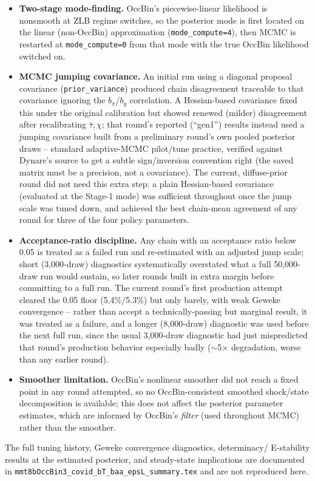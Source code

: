 \documentclass[11pt]{article}
\begin{document}
\begin{itemize}
\item \textbf{Two-stage mode-finding.} OccBin's piecewise-linear
likelihood is nonsmooth at ZLB regime switches, so the posterior mode
is first located on the linear (non-OccBin) approximation
(\texttt{mode\_compute=4}), then MCMC is restarted at
\texttt{mode\_compute=0} from that mode with the true OccBin likelihood
switched on.
\item \textbf{MCMC jumping covariance.} An initial run using a diagonal
proposal covariance (\texttt{prior\_variance}) produced chain
disagreement traceable to that covariance ignoring the $b_\pi$/$b_y$
correlation. A Hessian-based covariance fixed this under the original
calibration but showed renewed (milder) disagreement after
recalibrating $\bar\tau,\chi$; that round's reported (``gen1'') results
instead used a jumping covariance built from a preliminary round's own
pooled posterior draws -- standard adaptive-MCMC pilot/tune practice,
verified against Dynare's source to get a subtle sign/inversion
convention right (the saved matrix must be a precision, not a
covariance). The current, diffuse-prior round did not need this extra
step: a plain Hessian-based covariance (evaluated at the Stage-1 mode)
was sufficient throughout once the jump scale was tuned down, and
achieved the best chain-mean agreement of any round for three of the
four policy parameters.
\item \textbf{Acceptance-ratio discipline.} Any chain with an
acceptance ratio below 0.05 is treated as a failed run and re-estimated
with an adjusted jump scale; short (3,000-draw) diagnostics
systematically overstated what a full 50,000-draw run would sustain, so
later rounds built in extra margin before committing to a full run. The
current round's first production attempt cleared the 0.05 floor
(5.4\%/5.3\%) but only barely, with weak Geweke convergence -- rather
than accept a technically-passing but marginal result, it was treated as
a failure, and a longer (8,000-draw) diagnostic was used before the next
full run, since the usual 3,000-draw diagnostic had just mispredicted
that round's production behavior especially badly ($\sim$5$\times$
degradation, worse than any earlier round).
\item \textbf{Smoother limitation.} OccBin's nonlinear smoother did not
reach a fixed point in any round attempted, so no OccBin-consistent
smoothed shock/state decomposition is available; this does not affect
the posterior parameter estimates, which are informed by OccBin's
\emph{filter} (used throughout MCMC) rather than the smoother.
\end{itemize}

The full tuning history, Geweke convergence diagnostics, determinacy/
E-stability results at the estimated posterior, and steady-state
implications are documented in
\texttt{mmt8bOccBin3\_covid\_bT\_baa\_epsL\_summary.tex} and are not
reproduced here.
\end{document}
